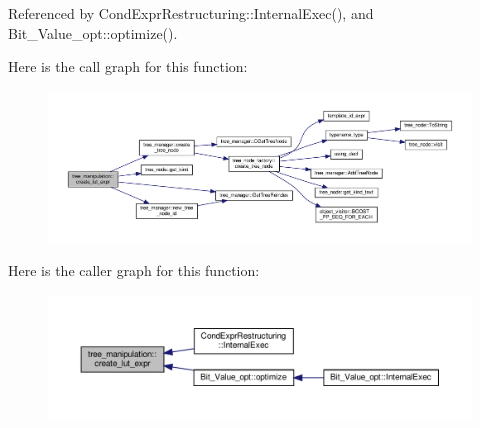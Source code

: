 Referenced by Cond\+Expr\+Restructuring\+::\+Internal\+Exec(), and Bit\+\_\+\+Value\+\_\+opt\+::optimize().

Here is the call graph for this function\+:
\nopagebreak
\begin{figure}[H]
\begin{center}
\leavevmode
\includegraphics[width=350pt]{d0/d99/classtree__manipulation_a4e5bf5b7cfb6244c0a2b7e13c0ac4514_cgraph}
\end{center}
\end{figure}
Here is the caller graph for this function\+:
\nopagebreak
\begin{figure}[H]
\begin{center}
\leavevmode
\includegraphics[width=350pt]{d0/d99/classtree__manipulation_a4e5bf5b7cfb6244c0a2b7e13c0ac4514_icgraph}
\end{center}
\end{figure}
\mbox{\label{classtree__manipulation_afdb65bb06cf5efd3516bf850d06e64b3}} 
